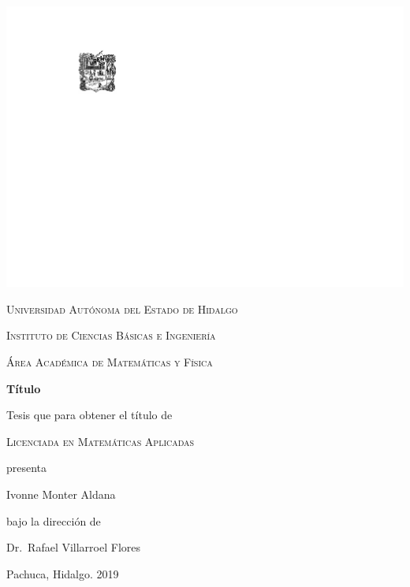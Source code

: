 \mainmatter 
\begin{titlepage}
  \begin{center}
    \null
    \vspace*{\fill}

    \includegraphics[scale=1.2,bb=55 20 0 0]{escudouaeh.pdf}

    \vspace*{\elespacio}

    \textsc{Universidad Autónoma del Estado de Hidalgo}

    \textsc{Instituto de Ciencias Básicas e Ingeniería}

    \textsc{Área Académica de Matemáticas y Física}

    \vspace*{\elespacio}

    {\Huge\bfseries Título\par}

    \vspace*{\elespacio}

    {\large Tesis que para obtener el título de}

    \vspace*{\elespacio}

    {\Large\textsc{Licenciada en Matemáticas Aplicadas}}

    \vspace*{\elespacio}

    {\large presenta}

    \vspace*{\elespacio}

    {\Huge Ivonne Monter Aldana}

    \vspace*{\elespacio}

    {\large bajo la dirección de}

    \bigskip

    {\Large Dr.~Rafael Villarroel Flores}

    \bigskip

    {Pachuca, Hidalgo. 2019}

    \vspace*{\fill}
  \end{center}
\end{titlepage}

